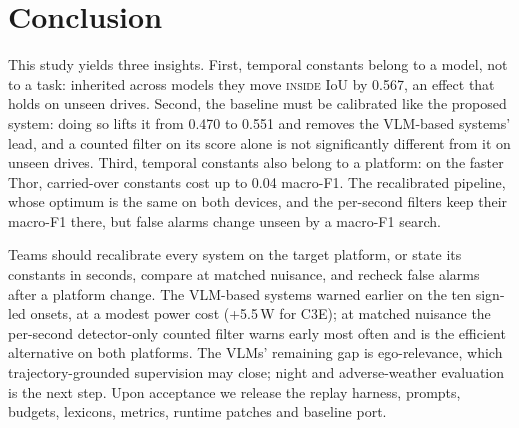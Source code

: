 \documentclass[conference]{IEEEtran}
\let\oldtextsc\textsc
\renewcommand{\textsc}[1]{\mbox{\oldtextsc{#1}}}
\begin{document}
\section{Conclusion}
\label{sec:conclusion}

This study yields three insights.  First, temporal constants belong to a model, not to a task: inherited across models they move \textsc{inside} IoU by 0.567, an effect that holds on unseen drives.  Second, the baseline must be calibrated like the proposed system: doing so lifts it from 0.470 to 0.551 and removes the VLM-based systems' lead, and a counted filter on its score alone is not significantly different from it on unseen drives.  Third, temporal constants also belong to a platform: on the faster Thor, carried-over constants cost up to 0.04 macro-F1.  The recalibrated pipeline, whose optimum is the same on both devices, and the per-second filters keep their macro-F1 there, but false alarms change unseen by a macro-F1 search.

Teams should recalibrate every system on the target platform, or state its constants in seconds, compare at matched nuisance, and recheck false alarms after a platform change.  The VLM-based systems warned earlier on the ten sign-led onsets, at a modest power cost (+5.5\,W for C3E); at matched nuisance the per-second detector-only counted filter warns early most often and is the efficient alternative on both platforms.  The VLMs' remaining gap is ego-relevance, which trajectory-grounded supervision may close; night and adverse-weather evaluation is the next step.  Upon acceptance we release the replay harness, prompts, budgets, lexicons, metrics, runtime patches and baseline port.



\end{document}

